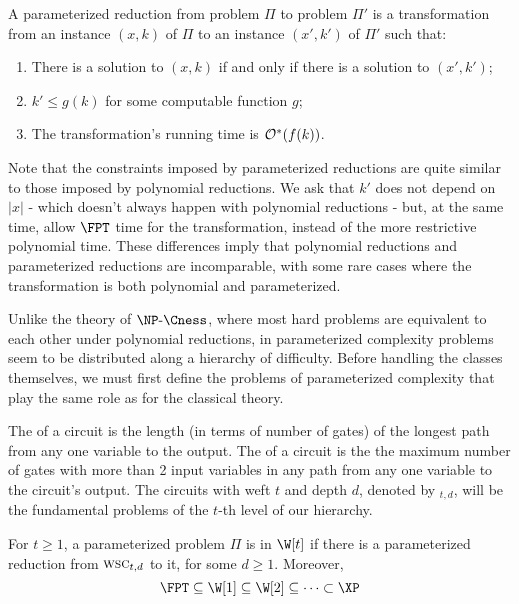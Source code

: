 \begin{class_definition*}
    A parameterized reduction from problem $\Pi$ to problem $\Pi'$ is a transformation from an instance $(x, k)$ of $\Pi$ to an instance $(x',k')$ of $\Pi'$ such that:
    \begin{enumerate}
        \item There is a solution to $(x,k)$ if and only if there is a solution to $(x',k')$;
        \item $k' \leq g(k)$ for some computable function $g$;
        \item The transformation's running time is $\mathcal{O}^*\!\left(f(k)\right)$.
    \end{enumerate}
\end{class_definition*}

Note that the constraints imposed by parameterized reductions are quite similar to those imposed by polynomial reductions.
We ask that $k'$ does not depend on $|x|$ - which doesn't always happen with polynomial reductions - but, at the same time, allow $\FPT$ time for the transformation, instead of the more restrictive polynomial time.
These differences imply that polynomial reductions and parameterized reductions are incomparable, with some rare cases where the transformation is both polynomial and parameterized.

Unlike the theory of $\NPcness$, where most hard problems are equivalent to each other under polynomial reductions, in parameterized complexity problems seem to be distributed along a hierarchy of difficulty.
Before handling the classes themselves, we must first define the problems of parameterized complexity that play the same role as  for the classical theory. 

The  of a circuit is the length (in terms of number of gates) of the longest path from any one variable to the output.
The  of a circuit is the the maximum number of gates with more than 2 input variables in any path from any one variable to the circuit's output.
The circuits with weft $t$ and depth $d$, denoted by $_{t,d}$, will be the fundamental problems of the $t$-th level of our hierarchy.


\begin{class_definition*}[$\W$-hierarchy]
    For $t \geq 1$, a parameterized problem $\Pi$ is in $\W[t]$ if there is a parameterized reduction from $\textsc{wsc}_{t,d}$ to it, for some $d \geq 1$. Moreover,
    \begin{equation*}
        \FPT \subseteq \W[1] \subseteq \W[2] \subseteq \cdots \subset \XP
    \end{equation*}
\end{class_definition*}


